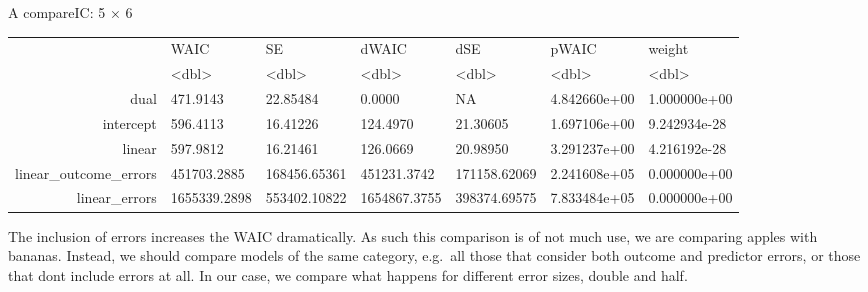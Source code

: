 \documentclass[11pt]{article}
\begin{document}
    A compareIC: 5 × 6
\begin{tabular}{r|llllll}
  & WAIC & SE & dWAIC & dSE & pWAIC & weight\\
  & <dbl> & <dbl> & <dbl> & <dbl> & <dbl> & <dbl>\\
\hline
	dual &     471.9143 &     22.85484 &       0.0000 &           NA & 4.842660e+00 & 1.000000e+00\\
	intercept &     596.4113 &     16.41226 &     124.4970 &     21.30605 & 1.697106e+00 & 9.242934e-28\\
	linear &     597.9812 &     16.21461 &     126.0669 &     20.98950 & 3.291237e+00 & 4.216192e-28\\
	linear\_outcome\_errors &  451703.2885 & 168456.65361 &  451231.3742 & 171158.62069 & 2.241608e+05 & 0.000000e+00\\
	linear\_errors & 1655339.2898 & 553402.10822 & 1654867.3755 & 398374.69575 & 7.833484e+05 & 0.000000e+00\\
\end{tabular}


    
    The inclusion of errors increases the WAIC dramatically. As such this
comparison is of not much use, we are comparing apples with bananas.
Instead, we should compare models of the same category, e.g.~all those
that consider both outcome and predictor errors, or those that dont
include errors at all. In our case, we compare what happens for
different error sizes, double and half.
\end{document}
